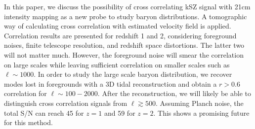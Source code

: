In this paper, we discuss the possibility of cross correlating kSZ signal with 
21cm intensity mapping as a new probe to study baryon distributions. 
A tomographic way of calculating cross correlation with estimated velocity field is applied.  
Correlation results are presented for redshift 1 and 2, considering foreground noises, 
finite telescope resolution, and redshift space distortions. 
The latter two will not matter much. 
However, the foreground noise will smear the correlation on large scales while leaving sufficient correlation on smaller scales such as $\ell\sim 1000$. 
In order to study the large scale baryon distribution, we recover modes lost in foregrounds 
with a 3D tidal reconstruction and obtain a $r>0.6$ correlation for $\ell\sim 100-2000$. 
After the reconstruction, we will likely be able to distinguish cross correlation signals from $\ell\gtrsim 500$. 
Assuming Planch noise, the total S/N can reach 45 for $z=1$ and 59 for $z=2$. 
This shows a promising future for this method.
 
